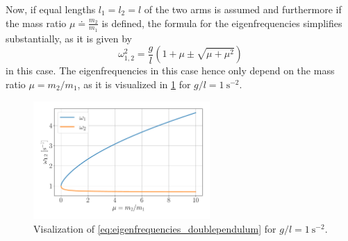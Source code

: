 \documentclass{report}
\numberwithin{tm}{section}
\begin{document}
Now, if equal lengths $l_1 = l_2 = l$ of the two arms is assumed and furthermore if the mass ratio $\mu \doteq \frac{m_2}{m_1}$ is defined, the formula for the eigenfrequencies simplifies substantially, as it is given by \begin{equation}\label{eq:eigenfrequencies_doublependulum}
	\omega_{1,2}^2 = \frac{g}{l}\left(1+\mu \pm \sqrt{\mu+\mu^2}\right)
\end{equation} in this case. The eigenfrequencies in this case hence only depend on the mass ratio $\mu = m_2/m_1$, as it is visualized in \cref{fig:eigenfrequencies_doublependulum} for $g/l= \SI{1}{\second^{-2}}$.
\begin{figure}[h]
	\centering
	\includegraphics[width=0.6\textwidth]{figures/eigenfrequencies_doublependulum.pdf}
	\caption{Visalization of \cref{eq:eigenfrequencies_doublependulum} for $g/l= \SI{1}{\second^{-2}}$.}
	\label{fig:eigenfrequencies_doublependulum}
\end{figure}
\end{document}
